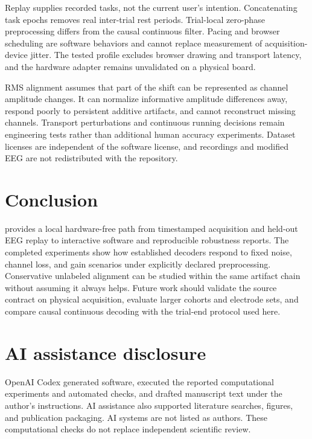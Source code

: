 \documentclass[11pt]{article}
\begin{document}
Replay supplies recorded tasks, not the current user's intention. Concatenating task epochs removes real inter-trial rest periods. Trial-local zero-phase preprocessing differs from the causal continuous filter. Pacing and browser scheduling are software behaviors and cannot replace measurement of acquisition-device jitter. The tested profile excludes browser drawing and transport latency, and the hardware adapter remains unvalidated on a physical board.

RMS alignment assumes that part of the shift can be represented as channel amplitude changes. It can normalize informative amplitude differences away, respond poorly to persistent additive artifacts, and cannot reconstruct missing channels. Transport perturbations and continuous running decisions remain engineering tests rather than additional human accuracy experiments. Dataset licenses are independent of the software license, and recordings and modified EEG are not redistributed with the repository.

\section{Conclusion}
\project{} provides a local hardware-free path from timestamped acquisition and held-out EEG replay to interactive software and reproducible robustness reports. The completed experiments show how established decoders respond to fixed noise, channel loss, and gain scenarios under explicitly declared preprocessing. Conservative unlabeled alignment can be studied within the same artifact chain without assuming it always helps. Future work should validate the source contract on physical acquisition, evaluate larger cohorts and electrode sets, and compare causal continuous decoding with the trial-end protocol used here.

\section*{AI assistance disclosure}
OpenAI Codex generated software, executed the reported computational experiments and automated checks, and drafted manuscript text under the author's instructions. AI assistance also supported literature searches, figures, and publication packaging. AI systems are not listed as authors. These computational checks do not replace independent scientific review.

\begingroup
\footnotesize
\setlength{\bibsep}{2pt}


\endgroup
\end{document}
